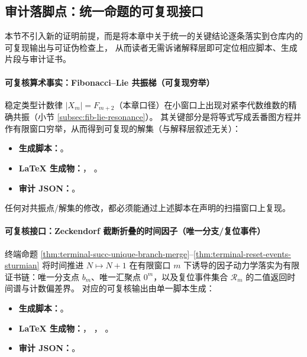 \subsection{审计落脚点：统一命题的可复现接口}\label{subsec:group-unification-audit-pointers}

本节不引入新的证明前提，而是将本章中关于统一的关键结论逐条落实到仓库内的可复现输出与可证伪检查上，
从而读者无需诉诸解释层即可定位相应脚本、生成片段与审计证书。

\paragraph{可复核算术事实：Fibonacci--Lie 共振梯（可复现穷举）}
稳定类型计数律 \(|X_m|=F_{m+2}\)（本章口径）在小窗口上出现对紧李代数维数的精确共振（小节 \ref{subsec:fib-lie-resonance}）。
其关键部分是将等式写成丢番图方程并作有限窗口穷举，从而得到可复现的解集（与解释层叙述无关）：
\begin{itemize}
  \item \textbf{生成脚本：}\texttt{}。
  \item \textbf{LaTeX 生成物：}\texttt{}，
  \texttt{}。
  \item \textbf{审计 JSON：}\texttt{}。
\end{itemize}
任何对共振点/解集的修改，都必须能通过上述脚本在声明的扫描窗口上复现。

\paragraph{可复核接口：Zeckendorf 截断折叠的时间因子（唯一分支/复位事件）}
终端命题 \ref{thm:terminal-succ-unique-branch-merge}--\ref{thm:terminal-reset-events-sturmian} 将时间推进 \(N\mapsto N+1\) 在有限窗口 \(m\) 下诱导的因子动力学落实为有限证书链：唯一分支点 \(b_m\)、唯一汇聚点 \(0^m\)，以及复位事件集合 \(\mathcal R_m\) 的二值返回时间谱与计数偏差界。
对应的可复核输出由单一脚本生成：
\begin{itemize}
  \item \textbf{生成脚本：}\texttt{}。
  \item \textbf{LaTeX 生成物：}\texttt{}，
  \texttt{}，
  \texttt{}。
  \item \textbf{审计 JSON：}\texttt{}。
\end{itemize}

